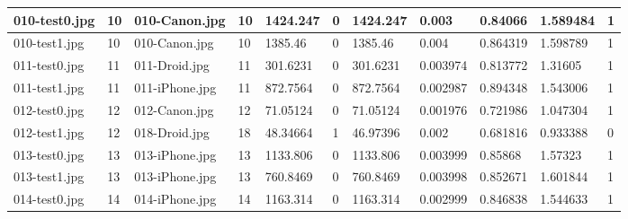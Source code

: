 \begin{landscape}
\begin{longtable}{|p{2cm}|p{1cm}|p{2cm}|p{1cm}|p{2cm}|p{1cm}|p{2cm}|p{2cm}|p{2cm}|p{2cm}|p{1cm}|}
		010-test0.jpg   & 10               & 010-Canon.jpg         & 10                          & 1424.247              & 0                       & 1424.247                   & 0.003                 & 0.84066               & 1.589484                 & 1                \\ \hline
		010-test1.jpg   & 10               & 010-Canon.jpg         & 10                          & 1385.46               & 0                       & 1385.46                    & 0.004                 & 0.864319              & 1.598789                 & 1                \\ \hline
		011-test0.jpg   & 11               & 011-Droid.jpg         & 11                          & 301.6231              & 0                       & 301.6231                   & 0.003974              & 0.813772              & 1.31605                  & 1                \\ \hline
		011-test1.jpg   & 11               & 011-iPhone.jpg        & 11                          & 872.7564              & 0                       & 872.7564                   & 0.002987              & 0.894348              & 1.543006                 & 1                \\ \hline
		012-test0.jpg   & 12               & 012-Canon.jpg         & 12                          & 71.05124              & 0                       & 71.05124                   & 0.001976              & 0.721986              & 1.047304                 & 1                \\ \hline
		012-test1.jpg   & 12               & 018-Droid.jpg         & 18                          & 48.34664              & 1                       & 46.97396                   & 0.002                 & 0.681816              & 0.933388                 & 0                \\ \hline
		013-test0.jpg   & 13               & 013-iPhone.jpg        & 13                          & 1133.806              & 0                       & 1133.806                   & 0.003999              & 0.85868               & 1.57323                  & 1                \\ \hline
		013-test1.jpg   & 13               & 013-iPhone.jpg        & 13                          & 760.8469              & 0                       & 760.8469                   & 0.003998              & 0.852671              & 1.601844                 & 1                \\ \hline
		014-test0.jpg   & 14               & 014-iPhone.jpg        & 14                          & 1163.314              & 0                       & 1163.314                   & 0.002999              & 0.846838              & 1.544633                 & 1                \\ \hline

\end{longtable}
\end{landscape}
